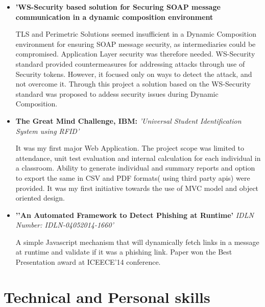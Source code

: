 \documentclass[11pt,a4paper,sans]{moderncv}        %
\begin{document}
\begin{itemize}

\item{\textbf{'WS-Security based solution for Securing SOAP message communication in a dynamic composition environment}

\vspace{3pt}

\small{TLS and Perimetric Solutions seemed insufficient in a Dynamic Composition environment for ensuring SOAP message security, as intermediaries could be compromised. Application Layer security was therefore needed. WS-Security standard provided countermeasures for addressing attacks through use of Security tokens. However, it focused only on ways to detect the attack, and not overcome it. Through this project a solution based on the WS-Security standard was proposed to addess security issues during Dynamic Composition.}}
\vspace{6pt}
\item{\textbf{The Great Mind Challenge, IBM:} \textit{'Universal Student Identification System using RFID'}

\vspace{3pt}

\small{It was my first major Web Application. The project scope was limited to attendance, unit test evaluation and internal calculation for each individual in a classroom. Ability to generate individual and summary reports and option to export the same in CSV and PDF formats( using third party apis) were provided. It was my first initiative towards the use of MVC model and object oriented design.}}
\vspace{6pt}
\item{\textbf{'’An Automated Framework to Detect Phishing at Runtime’} \textit{IDLN Number: IDLN-04052014-1660'}

\vspace{3pt}

\small{A simple Javascript mechanism that will dynamically fetch links in a message at runtime and validate if it was a phishing link. Paper won the Best Presentation award at ICEECE’14 conference.}}

\vspace{6pt}

\end{itemize}

\section{\textcolor{myblue}{Technical and Personal skills}}
\end{document}
